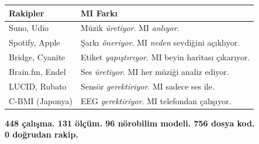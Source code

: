 \documentclass[9pt,a4paper,twocolumn]{extarticle}
\begin{document}
\vspace{-2pt}
\begin{footnotesize}
\renewcommand{\arraystretch}{1.15}
\begin{tabularx}{\columnwidth}{@{}L{1.8cm} L{4.7cm}@{}}
\toprule
\textbf{Rakipler} & \textbf{MI Fark\i} \\
\midrule
Suno, Udio & M\"uzik \textit{\"uretiyor}. MI \textit{anl\i yor}. \\
Spotify, Apple & \c{S}ark\i{} \textit{\"oneriyor}. MI \textit{neden} sevdi\u{g}ini a\c{c}\i kl\i yor. \\
Bridge, Cyanite & Etiket \textit{yap\i \c{s}t\i r\i yor}. MI beyin haritas\i{} \c{c}\i kar\i yor. \\
Brain.fm, Endel & Ses \textit{\"uretiyor}. MI her m\"uzi\u{g}i analiz ediyor. \\
LUCID, Rubato & Sens\"or \textit{gerektiriyor}. MI sadece ses ile. \\
C-BMI (Japonya) & EEG \textit{gerektiriyor}. MI telefondan \c{c}al\i \c{s}\i yor. \\
\bottomrule
\end{tabularx}
\end{footnotesize}

\vspace{6pt}
\begin{center}
{\small\textcolor{dk}{\textbf{448 \c{c}al\i \c{s}ma. 131 \"ol\c{c}\"um. 96 n\"orobilim modeli. 756 dosya kod.}}}\\[2pt]
{\small\textcolor{mi}{\textbf{0 do\u{g}rudan rakip.}}}
\end{center}
\end{document}
